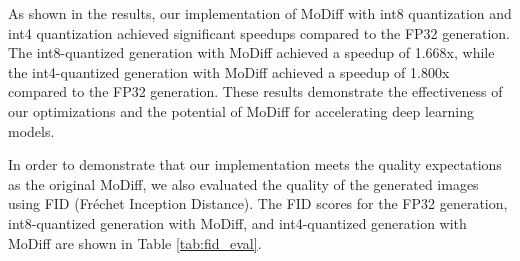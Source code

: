 


As shown in the results, our implementation of MoDiff with int8 quantization and int4 quantization achieved significant speedups compared to the FP32 generation. The int8-quantized generation with MoDiff achieved a speedup of 1.668x, while the int4-quantized generation with MoDiff achieved a speedup of 1.800x compared to the FP32 generation. These results demonstrate the effectiveness of our optimizations and the potential of MoDiff for accelerating deep learning models.

In order to demonstrate that our implementation meets the quality expectations as the original MoDiff, we also evaluated the quality of the generated images using FID (Fréchet Inception Distance). The FID scores for the FP32 generation, int8-quantized generation with MoDiff, and int4-quantized generation with MoDiff are shown in Table \ref{tab:fid_eval}.

